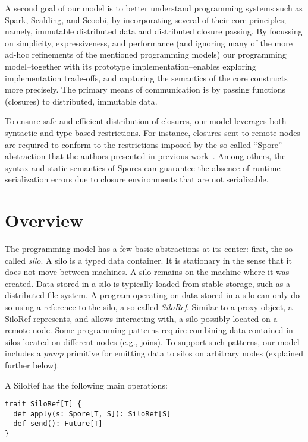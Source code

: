 \documentclass{easychair}
\begin{document}
A second goal of our model is to better understand programming systems such as Spark, Scalding, and
Scoobi, by incorporating several of their core principles; namely, immutable
distributed data and distributed closure passing. By focussing on simplicity,
expressiveness, and performance (and ignoring many of the more ad-hoc
refinements of the mentioned programming models) our
programming model--together with its prototype implementation--enables exploring
implementation trade-offs, and capturing the semantics of the core constructs more
precisely. The primary means of communication is by passing functions (closures)
to distributed, immutable data.

To ensure safe and efficient distribution of closures, our model leverages
both syntactic and type-based restrictions. For instance, closures sent to
remote nodes are required to conform to the restrictions imposed by the
so-called ``Spore'' abstraction that the authors presented in previous
work~\cite{MillerHO14}. Among others, the syntax and static semantics of
Spores can guarantee the absence of runtime serialization errors due to
closure environments that are not serializable.


\section{Overview}
\label{sec:overview}


The programming model has a few basic abstractions at its center: first, the
so-called \emph{silo}. A silo is a typed data container. It is stationary in the
sense that it does not move between machines. A silo remains on the machine
where it was created. Data stored in a silo is typically loaded from stable
storage, such as a distributed file system. A program operating on data stored
in a silo can only do so using a reference to the silo, a so-called \emph{SiloRef}.
Similar to a proxy object, a SiloRef represents, and allows interacting with,
a silo possibly located on a remote node. Some programming patterns require
combining data contained in silos located on different nodes (e.g., joins). To
support such patterns, our model includes a \emph{pump} primitive for emitting
data to silos on arbitrary nodes (explained further below).

A SiloRef has the following main operations:
\begin{verbatim}
trait SiloRef[T] {
  def apply(s: Spore[T, S]): SiloRef[S]
  def send(): Future[T]
}
\end{verbatim}
\end{document}
